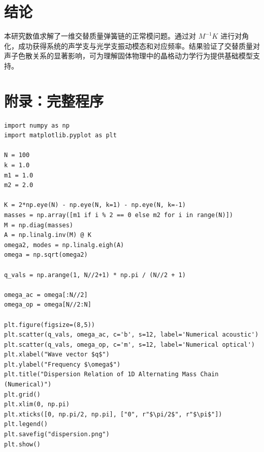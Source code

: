 \documentclass[12pt]{article}
\begin{document}
\section{结论}

本研究数值求解了一维交替质量弹簧链的正常模问题。通过对 $M^{-1}K$ 进行对角化，成功获得系统的声学支与光学支振动模态和对应频率。结果验证了交替质量对声子色散关系的显著影响，可为理解固体物理中的晶格动力学行为提供基础模型支持。

\section*{附录：完整程序}

\begin{lstlisting}
import numpy as np
import matplotlib.pyplot as plt

N = 100
k = 1.0
m1 = 1.0
m2 = 2.0

K = 2*np.eye(N) - np.eye(N, k=1) - np.eye(N, k=-1)
masses = np.array([m1 if i % 2 == 0 else m2 for i in range(N)])
M = np.diag(masses)
A = np.linalg.inv(M) @ K
omega2, modes = np.linalg.eigh(A)
omega = np.sqrt(omega2)

q_vals = np.arange(1, N//2+1) * np.pi / (N//2 + 1)

omega_ac = omega[:N//2]
omega_op = omega[N//2:N]

plt.figure(figsize=(8,5))
plt.scatter(q_vals, omega_ac, c='b', s=12, label='Numerical acoustic')
plt.scatter(q_vals, omega_op, c='m', s=12, label='Numerical optical')
plt.xlabel("Wave vector $q$")
plt.ylabel("Frequency $\omega$")
plt.title("Dispersion Relation of 1D Alternating Mass Chain (Numerical)")
plt.grid()
plt.xlim(0, np.pi)
plt.xticks([0, np.pi/2, np.pi], ["0", r"$\pi/2$", r"$\pi$"])
plt.legend()
plt.savefig("dispersion.png")
plt.show()
\end{lstlisting}
\end{document}
